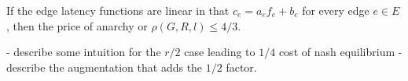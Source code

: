 \begin{theorem}
    If the edge latency functions are linear in that $c_e = a_ef_e + b_e$ for every edge $e \in E$, then the price of anarchy or $\rho(G, R,l) \leq 4/3$.
\end{theorem}

\begin{proof-sketch}
    - describe some intuition for the $r/2$ case leading to $1/4$ cost of nash equilibrium
    - describe the augmentation that adds the $1/2$ factor.
\end{proof-sketch}
    


